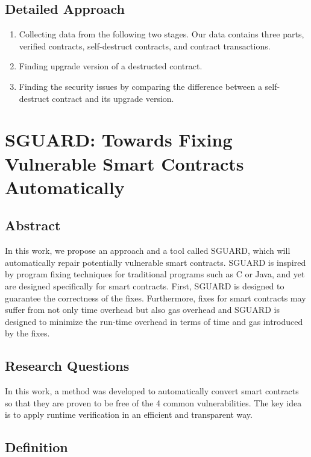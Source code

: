 \documentclass[a4paper, 10pt, conference, twocolumn]{ieeeconf}       %
\begin{document}
\subsection{Detailed Approach}

\begin{enumerate}
    \item Collecting data from the following two stages. Our data contains three parts, verified contracts, self-destruct contracts, and contract transactions.
    \item Finding upgrade version of a destructed contract.
    \item Finding the security issues by comparing the difference between a self-destruct contract and its upgrade version.
\end{enumerate}


\section{SGUARD: Towards Fixing Vulnerable Smart Contracts Automatically}\cite{2021sGUARD}

\subsection{Abstract}

In this work, we propose an approach and a tool called SGUARD, which will automatically repair potentially vulnerable smart contracts.
SGUARD is inspired by program fixing techniques for traditional programs such as C or Java, and yet are designed specifically for smart contracts.
First, SGUARD is designed to guarantee the correctness of the fixes.
Furthermore, fixes for smart contracts may suffer from not only time overhead but also gas overhead and SGUARD is designed to minimize the run-time overhead in terms of time and gas introduced by the fixes.

\subsection{Research Questions}

In this work, a method was developed to automatically convert smart contracts so that they are proven to be free of the 4 common vulnerabilities.
The key idea is to apply runtime verification in an efficient and transparent way.

\subsection{Definition}
\end{document}
